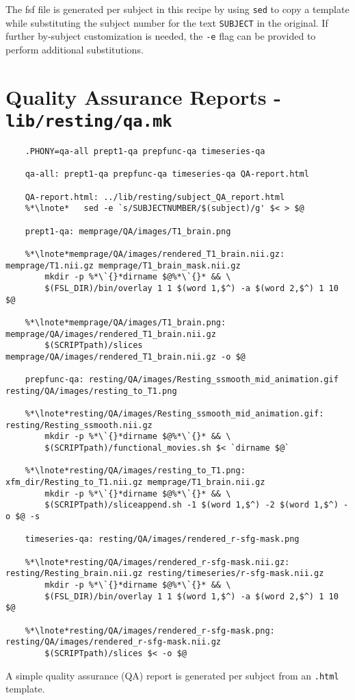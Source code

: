 The fsf file is generated per subject in this recipe by using \texttt{sed} to copy a template while substituting the subject number for the text \texttt{SUBJECT} in the original. If further by-subject customization is needed, the \texttt{-e} flag can be provided to perform additional substitutions.

\section{Quality Assurance Reports - \texttt{lib/resting/qa.mk}}
\begin{lstlisting}
	.PHONY=qa-all prept1-qa prepfunc-qa timeseries-qa
	
	qa-all: prept1-qa prepfunc-qa timeseries-qa QA-report.html
	
	QA-report.html: ../lib/resting/subject_QA_report.html
	%*\lnote*	sed -e `s/SUBJECTNUMBER/$(subject)/g' $< > $@
	
	prept1-qa: memprage/QA/images/T1_brain.png
	
	%*\lnote*memprage/QA/images/rendered_T1_brain.nii.gz: memprage/T1.nii.gz memprage/T1_brain_mask.nii.gz
		mkdir -p %*\`{}*dirname $@%*\`{}* && \
		$(FSL_DIR)/bin/overlay 1 1 $(word 1,$^) -a $(word 2,$^) 1 10 $@
	
	%*\lnote*memprage/QA/images/T1_brain.png: memprage/QA/images/rendered_T1_brain.nii.gz
		$(SCRIPTpath)/slices memprage/QA/images/rendered_T1_brain.nii.gz -o $@

	prepfunc-qa: resting/QA/images/Resting_ssmooth_mid_animation.gif resting/QA/images/resting_to_T1.png
	
	%*\lnote*resting/QA/images/Resting_ssmooth_mid_animation.gif: resting/Resting_ssmooth.nii.gz
		mkdir -p %*\`{}*dirname $@%*\`{}* && \
		$(SCRIPTpath)/functional_movies.sh $< `dirname $@`
	
	%*\lnote*resting/QA/images/resting_to_T1.png: xfm_dir/Resting_to_T1.nii.gz memprage/T1_brain.nii.gz
		mkdir -p %*\`{}*dirname $@%*\`{}* && \
		$(SCRIPTpath)/sliceappend.sh -1 $(word 1,$^) -2 $(word 1,$^) -o $@ -s
	
	timeseries-qa: resting/QA/images/rendered_r-sfg-mask.png
	
	%*\lnote*resting/QA/images/rendered_r-sfg-mask.nii.gz: resting/Resting_brain.nii.gz resting/timeseries/r-sfg-mask.nii.gz
		mkdir -p %*\`{}*dirname $@%*\`{}* && \
		$(FSL_DIR)/bin/overlay 1 1 $(word 1,$^) -a $(word 2,$^) 1 10 $@
	
	%*\lnote*resting/QA/images/rendered_r-sfg-mask.png: resting/QA/images/rendered_r-sfg-mask.nii.gz
		$(SCRIPTpath)/slices $< -o $@
\end{lstlisting}
A simple quality assurance (QA) report is generated per subject from an \texttt{.html} template.

